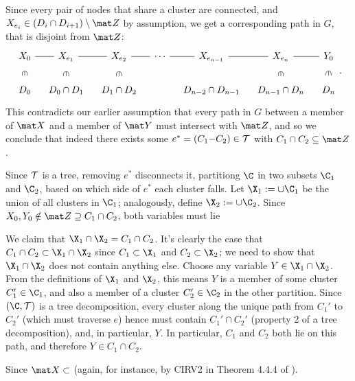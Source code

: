 Since every pair of nodes that share a cluster are connected, and 
    $X_{e_i} \in (D_i \cap D_{i+1}) \setminus \mat Z$ by assumption,
we get a corresponding path in $G$, that is disjoint from $\mat Z$:
\[\begin{tikzcd}[column sep=1em]
    X_0 \ar[r,-] \ar[d,sloped,phantom,"\in"]
    & X_{e_1}\ar[r,-] \ar[d,sloped,phantom,"\in"]
    & X_{e_2}\ar[r,-] \ar[d,sloped,phantom,"\in"]
       &\cdots\ar[r,-]
    & X_{e_{n-1}} \ar[r,-] %
    & X_{e_n}\ar[r,-] \ar[d,sloped,phantom,"\in"]
    & Y_0 \ar[d,sloped,phantom,"\in"]  
        \\
    D_0
    & D_0 \cap D_1
    & D_1 \cap D_2
    &
    & D_{n-2} \cap D_{n-1}
    & D_{n-1} \cap D_n
    & D_n
\end{tikzcd}.\]
This contradicts our earlier assumption that every path in $G$ between a member of $\mat X$ and a member of $\mat Y$ must intersect with $\mat Z$, and so we conclude that indeed there exists some $e^* = (C_1{-}C_2) \in \cal T$ with $C_1 \cap C_2 \subseteq \mat Z$.
     
Since $\cal T$ is a tree, removing $e^*$ disconnects it,
    partitiong $\C$ in two subsets $\C_1$ and $\C_2$, based on which side of $e^*$ each cluster falls. 
Let $\X_1 := \cup \C_1$ be the union of all clusters in $\C_1$; analogously, define $\X_2 := \cup \C_2$.
Since $X_0, Y_0 \notin \mat Z  \supseteq C_1 \cap C_2$, both variables must lie 

We claim that $\X_1 \cap \X_2 = C_1 \cap C_2$. 
It's clearly the case that $C_1 \cap C_2 \subset \X_1 \cap \X_2$ since $C_1 \subset \X_1$ and $C_2 \subset \X_2$; we need to show that $\X_1 \cap \X_2$ does not contain anything else.
Choose any variable $Y \in \X_1 \cap \X_2$. 
From the definitions of $\X_1$ and $\X_2$, this means $Y$ is a member of some cluster $C_1' \in \C_1$, and also a member of a cluster $C_2' \in \C_2$ in the other partition.  
Since $(\C, \cal T)$ is a tree decomposition, every cluster along the unique path from $C_1'$ to $C_2'$ (which must traverse $e$) hence must contain $C_1' \cap C_2'$ (property 2 of a tree decomposition), and, in particular, $Y$.  In particular, $C_1$ and $C_2$ both lie on this path, and therefore $Y \in C_1 \cap C_2$.


Since $\mat X \subset $
(again, for instance, by CIRV2 in Theorem 4.4.4 of \textcite{halpern2017reasoning}).

